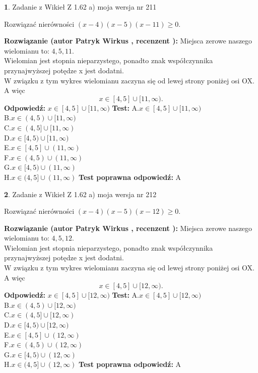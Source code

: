 \documentclass[12pt, a4paper]{article}
\theoremstyle{definition} %
\newtheorem{zad}{}
\newcommand{\zadStart}[1]{\begin{zad}#1\newline}
\newcommand{\zadStop}{\end{zad}}
\newcommand{\rozwStart}[2]{\noindent \textbf{Rozwiązanie (autor #1 , recenzent #2): }\newline}
\newcommand{\rozwStop}{\newline}
\newcommand{\odpStart}{\noindent \textbf{Odpowiedź:}\newline}
\newcommand{\odpStop}{\newline}
\newcommand{\testStart}{\noindent \textbf{Test:}\newline}
\newcommand{\testStop}{\newline}
\newcommand{\kluczStart}{\noindent \textbf{Test poprawna odpowiedź:}\newline}
\newcommand{\kluczStop}{\newline}
\begin{document}
\zadStart{Zadanie z Wikieł Z 1.62 a) moja wersja nr 211}

Rozwiązać nierówności $(x-4)(x-5)(x-11)\ge0$.
\zadStop
\rozwStart{Patryk Wirkus}{}
Miejsca zerowe naszego wielomianu to: $4, 5, 11$.\\
Wielomian jest stopnia nieparzystego, ponadto znak współczynnika przy\linebreak najwyższej potędze x jest dodatni.\\ W związku z tym wykres wielomianu zaczyna się od lewej strony poniżej osi OX. A więc $$x \in [4,5] \cup [11,\infty).$$
\rozwStop
\odpStart
$x \in [4,5] \cup [11,\infty)$
\odpStop
\testStart
A.$x \in [4,5] \cup [11,\infty)$\\
B.$x \in (4,5) \cup [11,\infty)$\\
C.$x \in (4,5] \cup [11,\infty)$\\
D.$x \in [4,5) \cup [11,\infty)$\\
E.$x \in [4,5] \cup (11,\infty)$\\
F.$x \in (4,5) \cup (11,\infty)$\\
G.$x \in [4,5) \cup (11,\infty)$\\
H.$x \in (4,5] \cup (11,\infty)$
\testStop
\kluczStart
A
\kluczStop



\zadStart{Zadanie z Wikieł Z 1.62 a) moja wersja nr 212}

Rozwiązać nierówności $(x-4)(x-5)(x-12)\ge0$.
\zadStop
\rozwStart{Patryk Wirkus}{}
Miejsca zerowe naszego wielomianu to: $4, 5, 12$.\\
Wielomian jest stopnia nieparzystego, ponadto znak współczynnika przy\linebreak najwyższej potędze x jest dodatni.\\ W związku z tym wykres wielomianu zaczyna się od lewej strony poniżej osi OX. A więc $$x \in [4,5] \cup [12,\infty).$$
\rozwStop
\odpStart
$x \in [4,5] \cup [12,\infty)$
\odpStop
\testStart
A.$x \in [4,5] \cup [12,\infty)$\\
B.$x \in (4,5) \cup [12,\infty)$\\
C.$x \in (4,5] \cup [12,\infty)$\\
D.$x \in [4,5) \cup [12,\infty)$\\
E.$x \in [4,5] \cup (12,\infty)$\\
F.$x \in (4,5) \cup (12,\infty)$\\
G.$x \in [4,5) \cup (12,\infty)$\\
H.$x \in (4,5] \cup (12,\infty)$
\testStop
\kluczStart
A
\kluczStop
\end{document}

